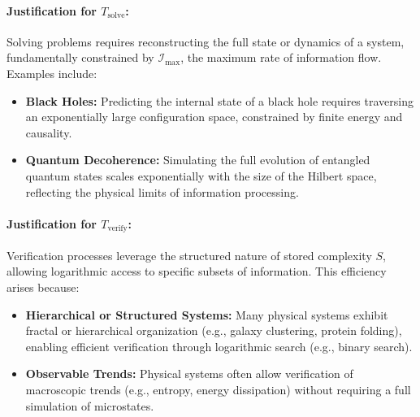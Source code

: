 \documentclass[12pt]{article}
\begin{document}
\paragraph{Justification for $T_{\text{solve}}$:}
Solving problems requires reconstructing the full state or dynamics of a system, fundamentally constrained by $\mathcal{I}_{\text{max}}$, the maximum rate of information flow. Examples include:
\begin{itemize}
    \item \textbf{Black Holes:} Predicting the internal state of a black hole requires traversing an exponentially large configuration space, constrained by finite energy and causality.
    \item \textbf{Quantum Decoherence:} Simulating the full evolution of entangled quantum states scales exponentially with the size of the Hilbert space, reflecting the physical limits of information processing.
\end{itemize}

\paragraph{Justification for $T_{\text{verify}}$:}
Verification processes leverage the structured nature of stored complexity $S$, allowing logarithmic access to specific subsets of information. This efficiency arises because:
\begin{itemize}
    \item \textbf{Hierarchical or Structured Systems:} Many physical systems exhibit fractal or hierarchical organization (e.g., galaxy clustering, protein folding), enabling efficient verification through logarithmic search (e.g., binary search).
    \item \textbf{Observable Trends:} Physical systems often allow verification of macroscopic trends (e.g., entropy, energy dissipation) without requiring a full simulation of microstates.
\end{itemize}
\end{document}
